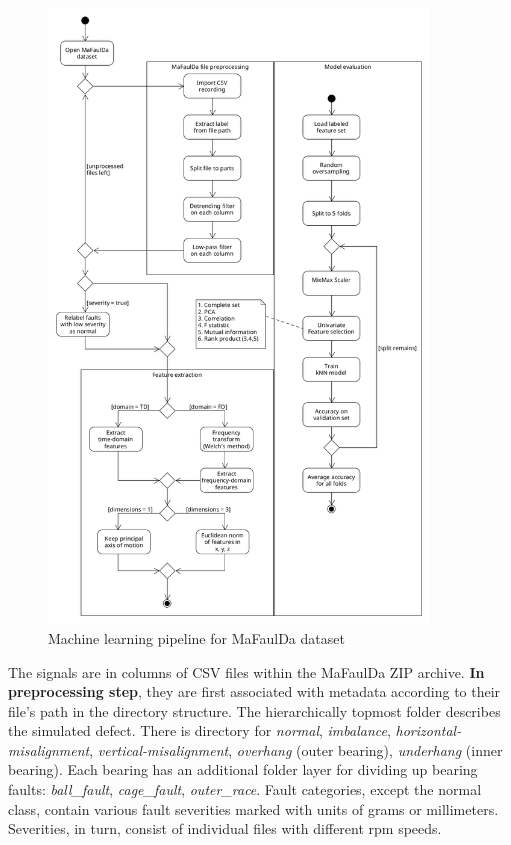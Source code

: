 \begin{figure}[h]
    \centering
	\includegraphics[width=0.9\textwidth]{assets/design/pipeline-design.png}
	\caption{Machine learning pipeline for MaFaulDa dataset}
	\label{fig:design:ml-pipeline}
\end{figure}
\afterpage{\clearpage}

The signals are in columns of CSV files within the MaFaulDa ZIP archive. \textbf{In preprocessing step}, they are first associated with metadata according to their file's path in the directory structure. The hierarchically topmost folder describes the simulated defect. There is directory for \emph{normal}, \emph{imbalance}, \emph{horizontal-misalignment}, \emph{vertical-misalignment}, \emph{overhang} (outer bearing), \emph{underhang} (inner bearing). Each bearing has an additional folder layer for dividing up bearing faults: \emph{ball\_fault}, \emph{cage\_fault}, \emph{outer\_race}. Fault categories, except the normal class, contain various fault severities marked with units of grams or millimeters. Severities, in turn, consist of individual files with different rpm speeds. 

